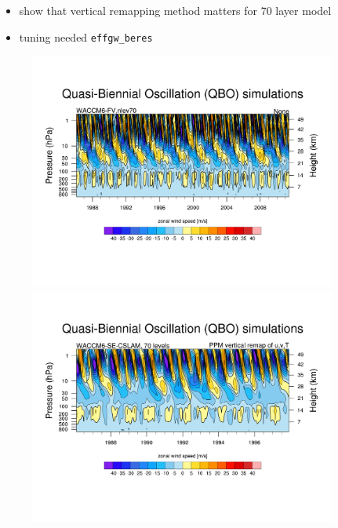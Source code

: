 \documentclass[draft]{agujournal2019}
\begin{document}
\begin{itemize}
\item show that vertical remapping method matters for 70 layer model
\item tuning needed \verb+effgw_beres+
\end{itemize}
\begin{figure}
\noindent\includegraphics[width=0.9\textwidth]{figs/qbo/qbo_fv09_nlev70.pdf}\\

\noindent\includegraphics[width=0.9\textwidth]{figs/qbo/qbo_ne30pg3_nlev70_oldremap.pdf}\\


\end{figure}
\end{document}
